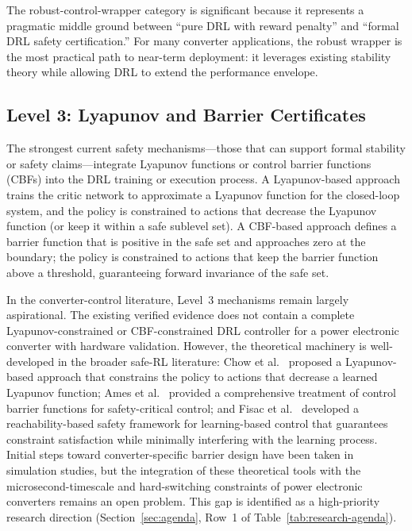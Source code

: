 \documentclass[manuscript,screen,review]{acmart}
\begin{document}
The robust-control-wrapper category is significant because it represents a pragmatic middle ground between ``pure DRL with reward penalty'' and ``formal DRL safety certification.''
For many converter applications, the robust wrapper is the most practical path to near-term deployment: it leverages existing stability theory while allowing DRL to extend the performance envelope.

\subsection{Level 3: Lyapunov and Barrier Certificates}

The strongest current safety mechanisms---those that can support formal stability or safety claims---integrate Lyapunov functions or control barrier functions (CBFs) into the DRL training or execution process.
A Lyapunov-based approach trains the critic network to approximate a Lyapunov function for the closed-loop system, and the policy is constrained to actions that decrease the Lyapunov function (or keep it within a safe sublevel set).
A CBF-based approach defines a barrier function that is positive in the safe set and approaches zero at the boundary; the policy is constrained to actions that keep the barrier function above a threshold, guaranteeing forward invariance of the safe set.

In the converter-control literature, Level~3 mechanisms remain largely aspirational.
The existing verified evidence does not contain a complete Lyapunov-constrained or CBF-constrained DRL controller for a power electronic converter with hardware validation.
However, the theoretical machinery is well-developed in the broader safe-RL literature: Chow et al.~\cite{chow2018lyapunov} proposed a Lyapunov-based approach that constrains the policy to actions that decrease a learned Lyapunov function; Ames et al.~\cite{ames2019control} provided a comprehensive treatment of control barrier functions for safety-critical control; and Fisac et al.~\cite{fisac2019general} developed a reachability-based safety framework for learning-based control that guarantees constraint satisfaction while minimally interfering with the learning process.
Initial steps toward converter-specific barrier design have been taken in simulation studies, but the integration of these theoretical tools with the microsecond-timescale and hard-switching constraints of power electronic converters remains an open problem.
This gap is identified as a high-priority research direction (Section~\ref{sec:agenda}, Row~1 of Table~\ref{tab:research-agenda}).
\end{document}
